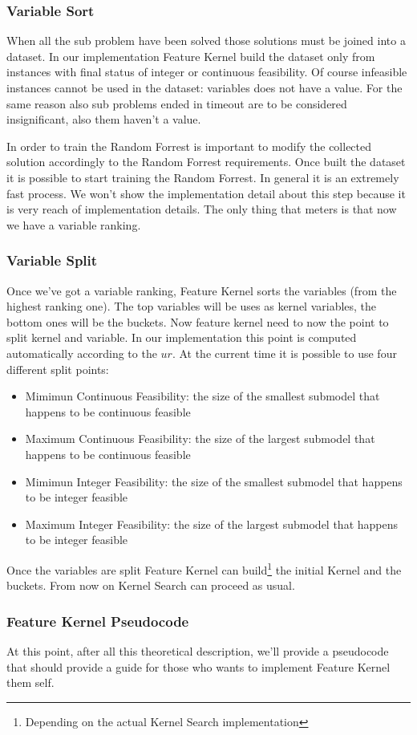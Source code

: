 \subsubsection{Variable Sort}
When all the sub problem have been solved those solutions must be joined into a dataset. In our implementation Feature Kernel build the dataset only from instances 
with final status of integer or continuous feasibility. Of course infeasible instances cannot be used in the dataset: variables does not have a value. For the same reason
also sub problems ended in timeout are to be considered insignificant, also them haven't a value.

In order to train the Random Forrest is important to modify the collected solution accordingly to the Random Forrest requirements. Once built the dataset it is possible to 
start training the Random Forrest. In general it is an extremely fast process. We won't show the implementation detail about this 
step because it is very reach of implementation details. 
The only thing that meters is that now we have a variable ranking.


\subsubsection{Variable Split}
Once we've got a variable ranking, Feature Kernel sorts the variables (from the highest ranking one). The top variables will be uses as kernel variables, the bottom ones will be
the buckets. Now feature kernel need to now the point to split kernel and variable. In our implementation this point is computed automatically according to the $ur$. 
At the current time it is possible to use four different split points:
\begin{itemize}
    \item Mimimun Continuous Feasibility: the size of the smallest submodel that happens to be continuous feasible
    \item  Maximum Continuous Feasibility: the size of the largest submodel that happens to be continuous feasible
    \item Mimimun Integer Feasibility: the size of the smallest submodel that happens to be integer feasible
    \item Maximum Integer Feasibility: the size of the largest submodel that happens to be integer feasible
\end{itemize}


Once the variables are split Feature Kernel can build\footnote{Depending on the actual Kernel Search implementation} the initial Kernel and the buckets. From now on Kernel Search can 
proceed as usual. 


\subsubsection{Feature Kernel Pseudocode}
At this point, after all this theoretical description, we'll provide a pseudocode that should provide a guide for those who wants to implement Feature Kernel them self.





